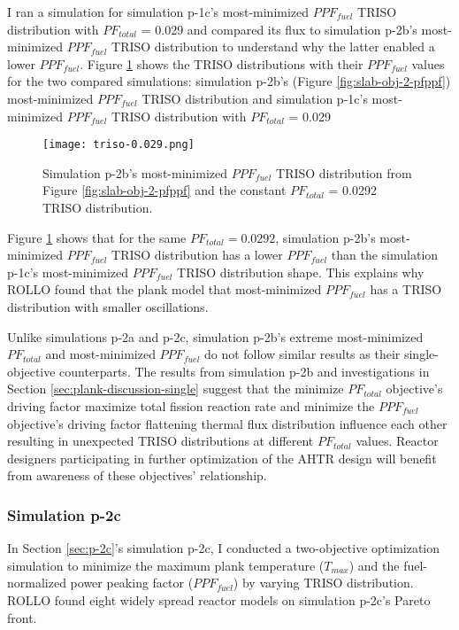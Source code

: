 I ran a simulation for simulation p-1c's most-minimized $PPF_{fuel}$ TRISO distribution 
with $PF_{total}$ = 0.029 and compared its flux to simulation p-2b's most-minimized 
$PPF_{fuel}$ TRISO distribution to understand why the latter enabled a lower 
$PPF_{fuel}$. 
Figure \ref{fig:triso-0.0292} shows the TRISO distributions with 
their $PPF_{fuel}$ values for the two compared 
simulations: simulation p-2b's (Figure \ref{fig:slab-obj-2-pfppf}) most-minimized 
$PPF_{fuel}$ TRISO distribution and simulation p-1c's most-minimized $PPF_{fuel}$ 
TRISO distribution with $PF_{total}$ = 0.029
\begin{figure}[htbp!]
    \centering
    \texttt{[image: triso-0.029.png]} 
    \caption{Simulation p-2b's most-minimized $PPF_{fuel}$ TRISO distribution 
    from Figure \ref{fig:slab-obj-2-pfppf} and the constant $PF_{total}$ = 0.0292
    TRISO distribution.}
    \label{fig:triso-0.0292}
\end{figure}
Figure \ref{fig:triso-0.0292} shows that for the same $PF_{total}=0.0292$, 
simulation p-2b's most-minimized $PPF_{fuel}$ TRISO distribution has a lower 
$PPF_{fuel}$ than the simulation p-1c's most-minimized $PPF_{fuel}$ TRISO distribution 
shape. 
This explains why \gls{ROLLO} found that the plank model that most-minimized 
$PPF_{fuel}$ has a TRISO distribution with smaller oscillations. 

Unlike simulations p-2a and p-2c, simulation p-2b's extreme most-minimized $PF_{total}$ 
and most-minimized $PPF_{fuel}$ do not follow similar results as their single-objective 
counterparts.  
The results from simulation p-2b and investigations in Section 
\ref{sec:plank-discussion-single} suggest that the minimize $PF_{total}$ 
objective's driving factor maximize total fission reaction rate and 
minimize the $PPF_{fuel}$ objective's driving factor flattening thermal flux 
distribution influence each other resulting in unexpected TRISO distributions at 
different $PF_{total}$ values. 
Reactor designers participating in further optimization of the \gls{AHTR} design 
will benefit from awareness of these objectives' relationship. 

\subsubsection{Simulation p-2c}
In Section \ref{sec:p-2c}'s simulation p-2c, I conducted a two-objective 
optimization simulation to minimize the maximum plank temperature ($T_{max}$) and the 
fuel-normalized power peaking factor ($PPF_{fuel}$) by varying TRISO distribution. 
\gls{ROLLO} found eight widely spread reactor models on simulation p-2c's Pareto 
front. 

